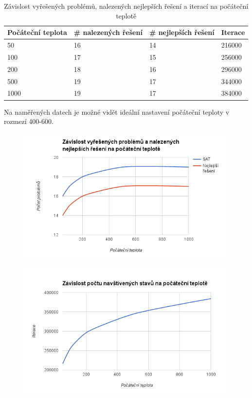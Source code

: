 \documentclass[10pt,a4paper]{article}
\begin{document}
\begin{table}[H]
\centering
  \begin{tabular}{ |l|l|l|l|}
  \hline
  Počáteční teplota & \# nalezených řešení & \# nejlepších řešení & Iterace\\
  \hline
    50   & 16 & 14 & 216000 \\
    100  & 17 & 15 & 256000 \\
    200  & 18 & 16 & 296000 \\
    500  & 19 & 17 & 344000 \\
    1000 & 19 & 17 & 384000 \\ 
  \hline
  \end{tabular}
  \caption{Závislost vyřešených problémů, nalezených nejlepších řešení a iterací na počáteční teplotě}
\end{table}

Na naměřených datech je možné vidět ideální nastavení počáteční teploty v rozmezí 400-600.

\begin{figure}[H]\centering
 \includegraphics[width=0.99\textwidth]{2}
\end{figure}

\begin{figure}[H]\centering
 \includegraphics[width=0.99\textwidth]{3}
\end{figure}
\end{document}
